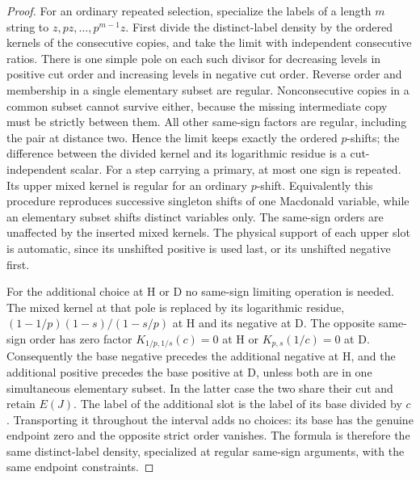 \begin{proof}
For an ordinary repeated selection, specialize the labels of a length
$m$ string to $z,pz,\ldots,p^{m-1}z$. First divide the distinct-label
density by the ordered kernels of the consecutive copies, and take
the limit with independent consecutive ratios. There is one simple
pole on each such divisor for decreasing levels in positive cut order
and increasing levels in negative cut order. Reverse order and
membership in a single elementary subset are regular. Nonconsecutive
copies in a common subset cannot survive either, because the missing
intermediate copy must be strictly between them. All other same-sign
factors are regular, including the pair at distance two. Hence the
limit keeps exactly the ordered $p$-shifts; the difference between the
divided kernel and its logarithmic residue is a cut-independent
scalar. For a step carrying a primary, at most one sign is repeated.
Its upper mixed kernel is regular for an ordinary $p$-shift.
Equivalently this procedure reproduces successive singleton shifts of
one Macdonald variable, while an elementary subset shifts distinct
variables only. The same-sign orders are unaffected by the inserted
mixed kernels. The physical support of each upper slot is automatic,
since its unshifted positive is used last, or its unshifted negative first.

For the additional choice at H or D no same-sign limiting operation is
needed. The mixed kernel at that pole is replaced by its logarithmic
residue, $(1-1/p)(1-s)/(1-s/p)$ at H and its negative at D. The
opposite same-sign order has zero factor
$K_{1/p,1/s}(c)=0$ at H or $K_{p,s}(1/c)=0$ at D. Consequently
the base negative precedes the additional negative at H, and the
additional positive precedes the base positive at D, unless both
are in one simultaneous elementary subset. In the latter case the
two share their cut and retain $E(J)$. The label of the additional
slot is the label of its base divided by $c$. Transporting it throughout
the interval adds no choices: its base has the genuine endpoint zero
and the opposite strict order vanishes. The formula is therefore the
same distinct-label density, specialized at regular same-sign
arguments, with the same endpoint constraints.


\end{proof}
